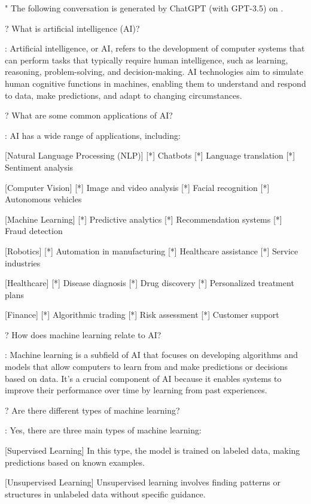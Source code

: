 "
  The following conversation is generated by ChatGPT (with GPT-3.5) on .

?
  What is artificial intelligence (AI)?

:
  Artificial intelligence, or AI, refers to the development of computer systems that can perform tasks that typically require human intelligence, such as learning, reasoning, problem-solving, and decision-making. AI technologies aim to simulate human cognitive functions in machines, enabling them to understand and respond to data, make predictions, and adapt to changing circumstances.

?
  What are some common applications of AI?

:
  AI has a wide range of applications, including:

  [Natural Language Processing (NLP)]
    [*] Chatbots
    [*] Language translation
    [*] Sentiment analysis

  [Computer Vision]
    [*] Image and video analysis
    [*] Facial recognition
    [*] Autonomous vehicles

  [Machine Learning]
    [*] Predictive analytics
    [*] Recommendation systems
    [*] Fraud detection

  [Robotics]
    [*] Automation in manufacturing
    [*] Healthcare assistance
    [*] Service industries

  [Healthcare]
    [*] Disease diagnosis
    [*] Drug discovery
    [*] Personalized treatment plans

  [Finance]
    [*] Algorithmic trading
    [*] Risk assessment
    [*] Customer support

?
  How does machine learning relate to AI?

:
  Machine learning is a subfield of AI that focuses on developing algorithms and models that allow computers to learn from and make predictions or decisions based on data. It's a crucial component of AI because it enables systems to improve their performance over time by learning from past experiences.

?
  Are there different types of machine learning?

:
  Yes, there are three main types of machine learning:

  [Supervised Learning]
    In this type, the model is trained on labeled data, making predictions based on known examples.

  [Unsupervised Learning]
    Unsupervised learning involves finding patterns or structures in unlabeled data without specific guidance.

